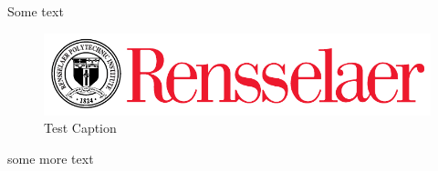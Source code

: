\documentclass[10pt]{article}
\begin{document}
Some text
\begin{figure}[!ht]
	\centering
	\includegraphics[width=.8\linewidth]{rpi_white}
	\caption{Test Caption}
\end{figure} 

some more text
\end{document}
